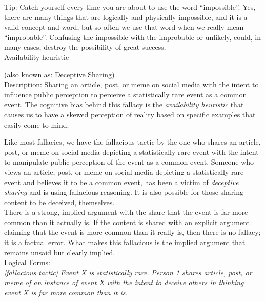 \documentclass[a4paper,12pt,single,pdftex]{scrartcl}
\begin{document}
    
      Tip: Catch yourself every time you are about to use the word “impossible”.  Yes, there are many things that are logically and physically impossible, and it is a valid concept and word, but so often we use that word when we really mean  “improbable”.  Confusing the impossible with the improbable or unlikely, could, in many cases, destroy the possibility of great success.
    \\

  

Availability heuristic
    
      (also known as: Deceptive Sharing)
    \\

  
    Description: Sharing an article, post, or meme on social media with the intent to influence public perception to perceive a statistically rare event as a common event. The cognitive bias behind this fallacy is the {\em availability heuristic} that causes us to have a skewed perception of reality based on specific examples that easily come to mind.

    
      Like most fallacies, we have the fallacious tactic by the one who shares an article, post, or meme on social media depicting a statistically rare event with the intent to manipulate public perception of the event as a common event. Someone who views an article, post, or meme on social media depicting a statistically rare event and believes it to be a common event, has been a victim of {\em deceptive sharing} and is using fallacious reasoning. It is also possible for those sharing content to be deceived, themselves.
    \\

    
      There is a strong, implied argument with the share that the event is far more common than it actually is. If the content is shared with an explicit argument claiming that the event is more common than it really is, then there is no fallacy; it is a factual error. What makes this fallacious is the implied argument that remains unsaid but clearly implied.
    \\

    
      Logical Forms:
    \\

    
      {\em [fallacious tactic]} \newline
{\em Event X is statistically rare.} \newline
{\em Person 1 shares article, post, or meme of an instance of event X with the intent to deceive others in thinking event X is far more common than it is.}
    \\
\end{document}
